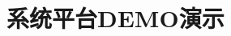 \documentclass[aspectratio=169, 10pt, utf8, mathserif]{beamer}
\begin{document}
%	
%
%	
%
%	
%
%	

\section{系统平台DEMO演示}
\end{document}
